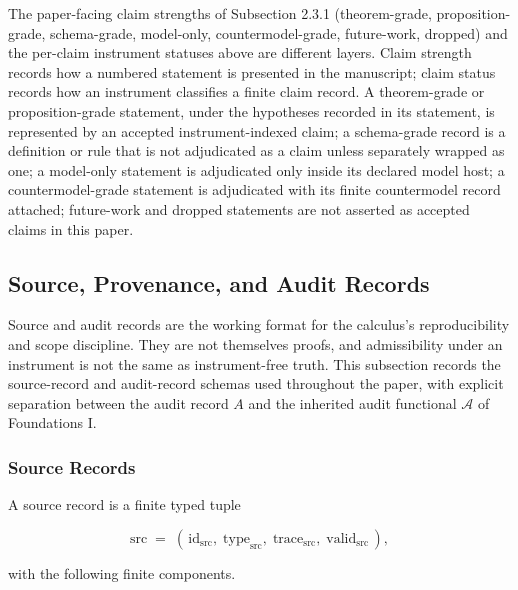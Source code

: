 \documentclass[11pt]{article}
\theoremstyle{definition}
\begin{document}
The paper-facing claim strengths of Subsection 2.3.1 (theorem-grade, proposition-grade, schema-grade, model-only, countermodel-grade, future-work, dropped) and the per-claim instrument statuses above are different layers. Claim strength records how a numbered statement is presented in the manuscript; claim status records how an instrument classifies a finite claim record. A theorem-grade or proposition-grade statement, under the hypotheses recorded in its statement, is represented by an accepted instrument-indexed claim; a schema-grade record is a definition or rule that is not adjudicated as a claim unless separately wrapped as one; a model-only statement is adjudicated only inside its declared model host; a countermodel-grade statement is adjudicated with its finite countermodel record attached; future-work and dropped statements are not asserted as accepted claims in this paper.

\subsection{Source, Provenance, and Audit Records}

Source and audit records are the working format for the calculus's reproducibility and scope discipline. They are not themselves proofs, and admissibility under an instrument is not the same as instrument-free truth. This subsection records the source-record and audit-record schemas used throughout the paper, with explicit separation between the audit record \(A\) and the inherited audit functional \(\mathcal A\) of Foundations I.

\subsubsection{Source Records}

A source record is a finite typed tuple

\[
\mathrm{src}\;=\;(\,\mathrm{id}_{\mathrm{src}},\;\mathrm{type}_{\mathrm{src}},\;\mathrm{trace}_{\mathrm{src}},\;\mathrm{valid}_{\mathrm{src}}\,),
\]

with the following finite components.
\end{document}
